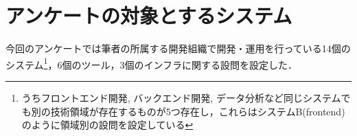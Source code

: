 \section{アンケートの対象とするシステム}
今回のアンケートでは筆者の所属する開発組織で開発・運用を行っている14個のシステム\footnote{うちフロントエンド開発, バックエンド開発, データ分析など同じシステムでも別の技術領域が存在するものが5つ存在し，これらはシステムB(frontend)のように領域別の設問を設定している}，6個のツール，3個のインフラに関する設問を設定した．
